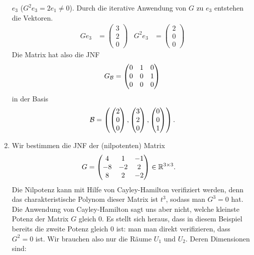 \begin{bspe}
\begin{enumerate}
		$ e_3 $ ($ G^2e_3 = 2e_1 \neq 0 $). Durch die iterative Anwendung von $G$ zu $e_3$ entstehen die Vektoren. 
		\begin{align*}
			Ge_3 &=  \begin{pmatrix}
				3 \\ 2 \\ 0
			\end{pmatrix} &
			G^2e_3 &= \begin{pmatrix}
				2 \\ 0 \\ 0
			\end{pmatrix}
		\end{align*}
		Die Matrix hat also die JNF 
		\[
		G_{\mathcal{B}} = \begin{pmatrix}
			0 & 1 & 0 \\
			0 & 0 & 1 \\
			0 & 0 & 0
		\end{pmatrix} 
		\] in der Basis 
		\[ \mathcal{B} = \left( \begin{pmatrix}
			2 \\ 0 \\ 0
		\end{pmatrix}, \begin{pmatrix}
			3 \\ 2 \\ 0
		\end{pmatrix}, \begin{pmatrix}
			0 \\ 0 \\ 1
		\end{pmatrix} \right).
		\]
		\item
		Wir bestimmen die JNF der (nilpotenten) Matrix 
		\begin{align*}
			G &= \begin{pmatrix}
				4 & 1 & -1 \\
				-8 & -2 & 2 \\
				8 & 2 & -2
			\end{pmatrix} \in \mathbb R^{3 \times 3}.
		\end{align*}
		Die Nilpotenz kann mit Hilfe von Cayley-Hamilton verifiziert werden, denn das charakteristische Polynom dieser Matrix ist $t^3$, sodass man $G^3 = 0$ hat. Die Anwendung von Cayley-Hamilton sagt uns aber nicht, welche kleinste Potenz der Matrix $G$ gleich $0$. Es stellt sich heraus, dass in diesem Beispiel bereits die zweite Potenz gleich $0$ ist: man man direkt verifizieren, dass $G^2 = 0$ ist. Wir brauchen also nur die Räume $U_1$ und $U_2$. Deren Dimensionen sind: 
		\begin{align*}

\end{align*}
\end{enumerate}
\end{bspe}
